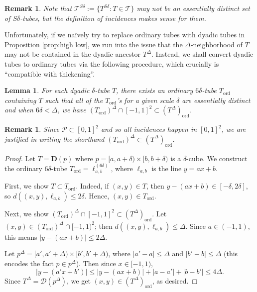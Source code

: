 \documentclass{amsart}
\newtheorem{lemma}[prop]{Lemma}
\newtheorem{remark}[prop]{Remark}
\newcommand{\cD}{\mathcal{D}}
\newcommand{\cT}{\mathcal{T}}
\newcommand{\cP}{\mathcal{P}}
\newcommand{\ord}{\mathrm{ord}}
\newcommand{\bD}{\mathbf{D}}
\begin{document}
\begin{remark}
Note that $\cT^{S\delta} :=\{ T^{S\delta}: T\in \cT\}$ may not be an essentially distinct set of $S\delta$-tubes, but the definition of incidences makes sense for them.
\end{remark}

Unfortunately, if we na\"{i}vely try to replace ordinary tubes with dyadic tubes in Proposition \ref{prop:high low}, we run into the issue that the $\Delta$-neighborhood of $T$ may not be contained in the dyadic ancestor $T^\Delta$. Instead, we shall convert dyadic tubes to ordinary tubes via the following procedure, which crucially is ``compatible with thickening''.

\begin{lemma}\label{lem:thicken dyadic tube}
    For each dyadic $\delta$-tube $T$, there exists an ordinary $6\delta$-tube $T_\ord$ containing $T$ such that all of the $T_\ord$'s for a given scale $\delta$ are essentially distinct and when $6\delta < \Delta$, we have $(T_\ord)^\Delta \cap [-1, 1]^2 \subset (T^\Delta)_\ord$.
\end{lemma}

\begin{remark}
    Since $\cP \subset [0, 1]^2$ and so all incidences happen in $[0,1]^2$, we are justified in writing the shorthand $(T_\ord)^\Delta \subset (T^\Delta)_\ord$.
\end{remark}

\begin{proof}
    Let $T = \bD(p)$ where $p = [a, a+\delta) \times [b, b+\delta)$ is a $\delta$-cube. We construct the ordinary $6\delta$-tube $T_\ord = \ell_{a,b}^{(6\delta)}$, where $\ell_{a,b}$ is the line $y = ax + b$.

    First, we show $T \subset T_\ord$. Indeed, if $(x, y) \in T$, then $y - (ax + b) \in [-\delta, 2\delta]$, so $d((x, y), \ell_{a,b}) \le 2\delta$. Hence, $(x, y) \in T_\ord$.

    Next, we show $(T_\ord)^\Delta \cap [-1, 1]^2 \subset (T^\Delta)_\ord$. Let $(x, y) \in (T_\ord)^\Delta \cap [-1, 1)^2$; then $d((x, y), \ell_{a,b}) \le \Delta$. Since $a \in (-1, 1)$, this means $|y - (ax + b)| \le 2\Delta$.
    
    Let $p^\Delta = [a', a'+\Delta) \times [b', b'+\Delta)$, where $|a' - a| \le \Delta$ and $|b' - b| \le \Delta$ (this encodes the fact $p \in p^\Delta$). Then since $x \in [-1, 1)$,
    \begin{equation*}
        |y - (a'x + b')| \le |y - (ax + b)| + |a - a'| + |b - b'| \le 4\Delta.
    \end{equation*}
    Since $T^\Delta = \cD(p^\Delta)$, we get $(x, y) \in (T^\Delta)_\ord$, as desired.
\end{proof}
\end{document}
